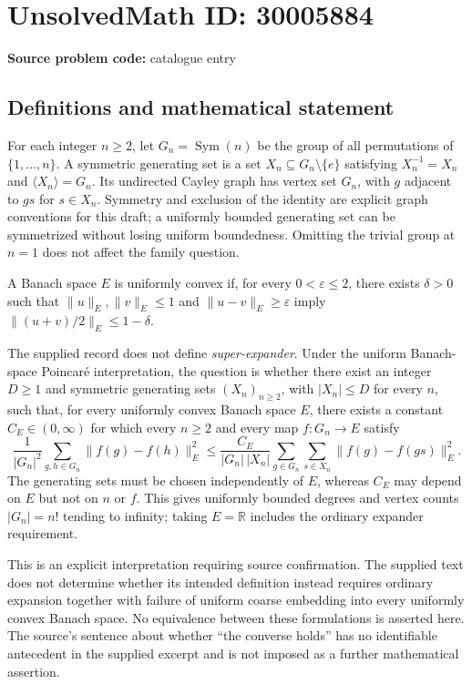 \documentclass[11pt]{article}
\newcommand{\R}{\mathbb{R}}
\begin{document}
\section*{UnsolvedMath ID: 30005884}
\textbf{Source problem code:} catalogue entry
\subsection{Definitions and mathematical statement}
For each integer \(n\geq 2\), let \(G_n=\operatorname{Sym}(n)\) be the group of all permutations of \(\{1,\ldots,n\}\). A symmetric generating set is a set \(X_n\subseteq G_n\setminus\{e\}\) satisfying \(X_n^{-1}=X_n\) and \(\langle X_n\rangle=G_n\). Its undirected Cayley graph has vertex set \(G_n\), with \(g\) adjacent to \(gs\) for \(s\in X_n\). Symmetry and exclusion of the identity are explicit graph conventions for this draft; a uniformly bounded generating set can be symmetrized without losing uniform boundedness. Omitting the trivial group at \(n=1\) does not affect the family question.

A Banach space \(E\) is uniformly convex if, for every \(0<\varepsilon\leq 2\), there exists \(\delta>0\) such that \(\|u\|_E,\|v\|_E\leq 1\) and \(\|u-v\|_E\geq\varepsilon\) imply \(\|(u+v)/2\|_E\leq 1-\delta\).

The supplied record does not define \emph{super-expander}. Under the uniform Banach-space Poincar\'e interpretation, the question is whether there exist an integer \(D\geq 1\) and symmetric generating sets \((X_n)_{n\geq 2}\), with \(|X_n|\leq D\) for every \(n\), such that, for every uniformly convex Banach space \(E\), there exists a constant \(C_E\in(0,\infty)\) for which every \(n\geq 2\) and every map \(f:G_n\to E\) satisfy
\[
\frac{1}{|G_n|^2}\sum_{g,h\in G_n}\|f(g)-f(h)\|_E^2
\leq
\frac{C_E}{|G_n|\,|X_n|}
\sum_{g\in G_n}\sum_{s\in X_n}\|f(g)-f(gs)\|_E^2.
\]
The generating sets must be chosen independently of \(E\), whereas \(C_E\) may depend on \(E\) but not on \(n\) or \(f\). This gives uniformly bounded degrees and vertex counts \(|G_n|=n!\) tending to infinity; taking \(E=\R\) includes the ordinary expander requirement.

This is an explicit interpretation requiring source confirmation. The supplied text does not determine whether its intended definition instead requires ordinary expansion together with failure of uniform coarse embedding into every uniformly convex Banach space. No equivalence between these formulations is asserted here. The source's sentence about whether ``the converse holds'' has no identifiable antecedent in the supplied excerpt and is not imposed as a further mathematical assertion.
\end{document}
